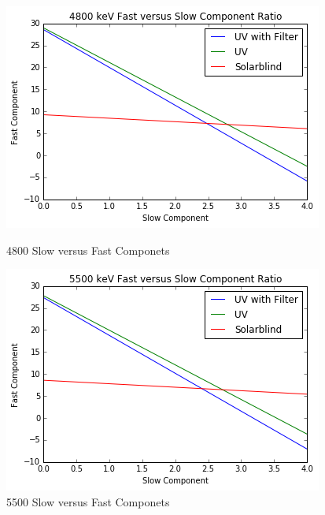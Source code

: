 \documentclass{article}
\begin{document}
\begin{figure}[H]
  \centering
  \begin{minipage}[b]{0.4\textwidth}
    \includegraphics[width=\textwidth]{first.png}
    \caption{4800 Slow versus Fast Componets}
  \end{minipage}
  \hfill
  \begin{minipage}[b]{0.4\textwidth}
    \includegraphics[width=\textwidth]{second.png}
    \caption{5500 Slow versus Fast Componets}
  \end{minipage}
\end{figure}
\end{document}
